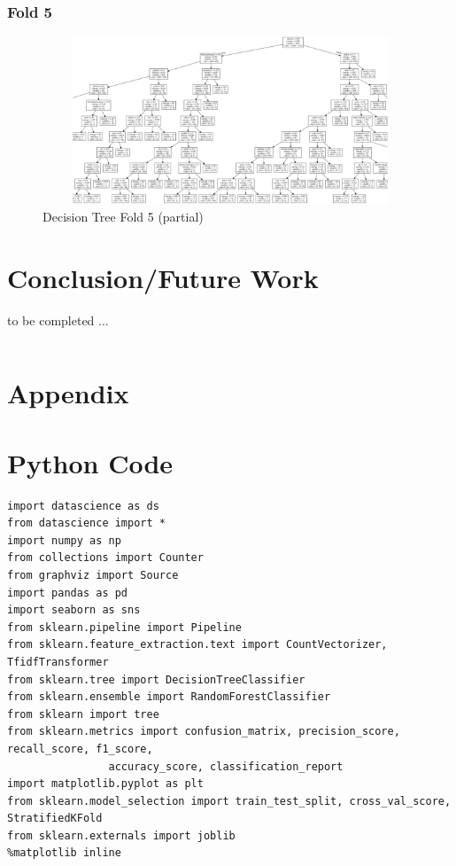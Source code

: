 \documentclass{article} %
\begin{document}
\subsubsection{Fold 5}

\begin{figure}[H]
	\includegraphics[height=5cm, width=17cm]{15.png}
	\caption{Decision Tree Fold 5 (partial)}
\end{figure}


\section{Conclusion/Future Work}


to be completed \cite{DBLP:journals/corr/abs-1802-05365} ...






\[\]


\section{Appendix}
\appendix
\section{Python Code}

\lstset{language=Python}
\lstset{frame=lines}
\lstset{basicstyle=\footnotesize}
\begin{lstlisting}
import datascience as ds
from datascience import *
import numpy as np
from collections import Counter
from graphviz import Source
import pandas as pd
import seaborn as sns
from sklearn.pipeline import Pipeline
from sklearn.feature_extraction.text import CountVectorizer, TfidfTransformer
from sklearn.tree import DecisionTreeClassifier
from sklearn.ensemble import RandomForestClassifier
from sklearn import tree
from sklearn.metrics import confusion_matrix, precision_score, recall_score, f1_score, 
			    accuracy_score, classification_report
import matplotlib.pyplot as plt
from sklearn.model_selection import train_test_split, cross_val_score, StratifiedKFold
from sklearn.externals import joblib
%matplotlib inline
\end{lstlisting}
\end{document}
